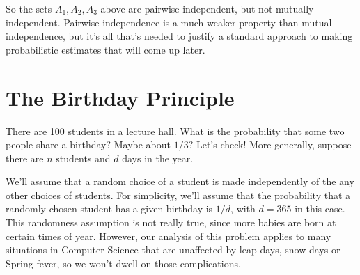 So the sets $A_1,A_2,A_3$ above are pairwise independent, but not mutually
independent.  Pairwise independence is a much weaker property than mutual
independence, but it's all that's needed to justify a standard approach to
making probabilistic estimates that will come up later.

\section{The Birthday Principle}\label{birthday_principle_sec}

There are 100 students in a lecture hall.  What is the probability that
some two people share a birthday?  Maybe about $1/3$?  Let's check!  More
generally, suppose there are $n$ students and $d$ days in the year.

We'll assume that a random choice of a student is made independently of
the any other choices of students.  For simplicity, we'll assume that the
probability that a randomly chosen student has a given birthday is $1/d$,
with $d= 365$ in this case.  This randomness assumption is not really
true, since more babies are born at certain times of year.  However, our
analysis of this problem applies to many situations in Computer Science
that are unaffected by leap days, snow days or Spring fever, so we won't
dwell on those complications.

